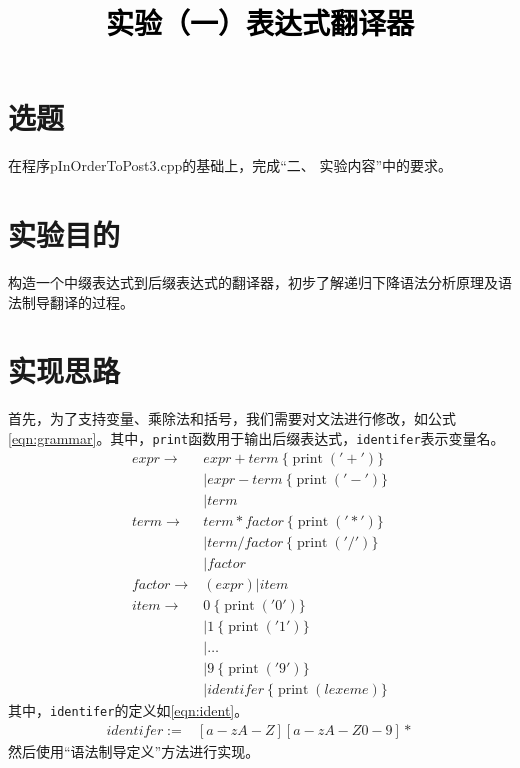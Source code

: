 \documentclass[a4paper,twoside]{article}
\newcommand{\PaperTitle}{实验（一）表达式翻译器}  %
\begin{document}
\newpage

\title{
	\Large{\textcolor{black}{\PaperTitle}}
}
	
	
\maketitle
	
\tableofcontents
 
\newpage
\setcounter{page}{1}

\begin{spacing}{1.2}

\section{选题}

在程序pInOrderToPost3.cpp的基础上，完成“二、 实验内容”中的要求。 

\section{实验目的}

构造一个中缀表达式到后缀表达式的翻译器，初步了解递归下降语法分析原理及语法制导翻译的过程。

\section{实现思路}

首先，为了支持变量、乘除法和括号，我们需要对文法进行修改，如公式\eqref{eqn:grammar}。其中，\texttt{print}函数用于输出后缀表达式，\texttt{identifer}表示变量名。
\begin{equation}
\label{eqn:grammar}
\begin{aligned}
expr \rightarrow & expr + term \ \{\mathop{print}('+')\} \\
 &| expr - term \ \{\mathop{print}('-')\} \\
 &| term \\
term \rightarrow & term * factor \ \{\mathop{print}('*')\} \\
 &| term / factor \ \{\mathop{print}('/')\} \\
 &| factor \\
factor \rightarrow & ( expr ) | item \\
item \rightarrow & 0  \ \{\mathop{print}('0')\} \\
 &| 1  \ \{\mathop{print}('1')\} \\
 &| \dots \\
 &| 9  \ \{\mathop{print}('9')\} \\
 &| identifer \ \{\mathop{print}(lexeme)\}
\end{aligned}
\end{equation}
其中，\texttt{identifer}的定义如\eqref{eqn:ident}。
\begin{equation}
\label{eqn:ident}
\begin{aligned}
identifer := & [a-zA-Z] [a-zA-Z0-9]*
\end{aligned}
\end{equation}
然后使用“语法制导定义”方法进行实现。


\end{spacing}
\end{document}

